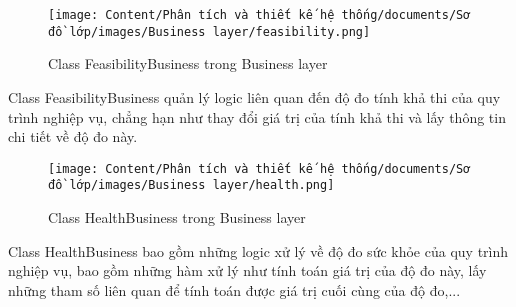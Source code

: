 \begin{figure}[H]
    \centering
    \texttt{[image: Content/Phân tích và thiết kế hệ thống/documents/Sơ đồ lớp/images/Business layer/feasibility.png]}
    \vspace{0.5cm}
    \caption{Class FeasibilityBusiness trong Business layer}
    \label{fig:Class FeasibilityBusiness trong Business layer}
\end{figure}
\par
Class FeasibilityBusiness quản lý logic liên quan đến độ đo tính khả thi của quy trình nghiệp vụ, chẳng hạn như thay đổi giá trị 
của tính khả thi và lấy thông tin chi tiết về độ đo này.
\begin{figure}[H]
    \centering
    \texttt{[image: Content/Phân tích và thiết kế hệ thống/documents/Sơ đồ lớp/images/Business layer/health.png]}
    \vspace{0.5cm}
    \caption{Class HealthBusiness trong Business layer}
    \label{fig:Class HealthBusiness trong Business layer}
\end{figure}
\par
Class HealthBusiness bao gồm những logic xử lý về độ đo sức khỏe của quy trình nghiệp vụ, bao gồm những hàm xử lý như tính toán 
giá trị của độ đo này, lấy những tham số liên quan để tính toán được giá trị cuối cùng của độ đo,...
